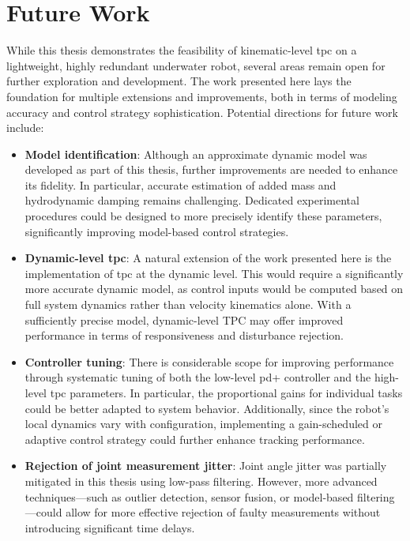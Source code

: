 \section{Future Work}
\label{sec:conclusion:future_work}

While this thesis demonstrates the feasibility of kinematic-level \gls{tpc} on a lightweight, highly redundant underwater robot, several areas remain open for further exploration and development. The work presented here lays the foundation for multiple extensions and improvements, both in terms of modeling accuracy and control strategy sophistication. Potential directions for future work include:

\begin{itemize}
    \item \textbf{Model identification}: Although an approximate dynamic model was developed as part of this thesis, further improvements are needed to enhance its fidelity. In particular, accurate estimation of added mass and hydrodynamic damping remains challenging. Dedicated experimental procedures could be designed to more precisely identify these parameters, significantly improving model-based control strategies.

    \item \textbf{Dynamic-level \gls{tpc}}: A natural extension of the work presented here is the implementation of \gls{tpc} at the dynamic level. This would require a significantly more accurate dynamic model, as control inputs would be computed based on full system dynamics rather than velocity kinematics alone. With a sufficiently precise model, dynamic-level TPC may offer improved performance in terms of responsiveness and disturbance rejection.

    \item \textbf{Controller tuning}: There is considerable scope for improving performance through systematic tuning of both the low-level \gls{pd+} controller and the high-level \gls{tpc} parameters. In particular, the proportional gains for individual tasks could be better adapted to system behavior. Additionally, since the robot's local dynamics vary with configuration, implementing a gain-scheduled or adaptive control strategy could further enhance tracking performance.

    \item \textbf{Rejection of joint measurement jitter}: Joint angle jitter was partially mitigated in this thesis using low-pass filtering. However, more advanced techniques—such as outlier detection, sensor fusion, or model-based filtering—could allow for more effective rejection of faulty measurements without introducing significant time delays.


\end{itemize}
